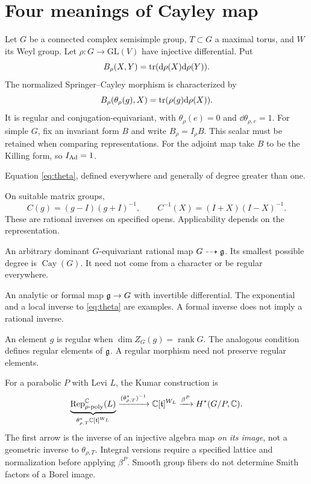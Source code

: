 \section{Four meanings of Cayley map}
Let $G$ be a connected complex semisimple group, $T\subset G$ a maximal torus, and $W$ its Weyl group. Let $\rho:G\to\mathrm{GL}(V)$ have injective differential. Put
\[
B_\rho(X,Y)=\operatorname{tr}(\mathrm d\rho(X)\mathrm d\rho(Y)).
\]
The normalized Springer--Cayley morphism is characterized by
\begin{equation}\label{eq:theta}
B_\rho(\theta_\rho(g),X)=\operatorname{tr}(\rho(g)\mathrm d\rho(X)).
\end{equation}
It is regular and conjugation-equivariant, with $\theta_\rho(e)=0$ and $\dd\theta_{\rho,e}=1$. For simple $G$, fix an invariant form $B$ and write $B_\rho=I_\rho B$. This scalar must be retained when comparing representations. For the adjoint map take $B$ to be the Killing form, so $I_{\operatorname{Ad}}=1$.
\begin{description}[style=nextline]
\item[Trace projection.] Equation \eqref{eq:theta}, defined everywhere and generally of degree greater than one.
\item[Classical matrix transform.] On suitable matrix groups,
\[
C(g)=(g-I)(g+I)^{-1},\qquad C^{-1}(X)=(I+X)(I-X)^{-1}.
\]
These are rational inverses on specified opens. Applicability depends on the representation.
\item[Equivariant rational Cayley map.] An arbitrary dominant $G$-equivariant rational map $G\dashrightarrow\mathfrak g$. Its smallest possible degree is $\operatorname{Cay}(G)$. It need not come from a character or be regular everywhere.
\item[Local coordinate map.] An analytic or formal map $\mathfrak g\to G$ with invertible differential. The exponential and a local inverse to \eqref{eq:theta} are examples. A formal inverse does not imply a rational inverse.
\end{description}
An element $g$ is regular when $\dim Z_G(g)=\operatorname{rank}G$. The analogous condition defines regular elements of $\mathfrak g$. A regular morphism need not preserve regular elements.

For a parabolic $P$ with Levi $L$, the Kumar construction is
\begin{equation}\label{eq:borel}
\underbrace{\operatorname{Rep}^{\mathbb C}_{\rho\text{-poly}}(L)}_{\theta_{\rho,T}^*\mathbb C[\mathfrak t]^{W_L}}
\xrightarrow{(\theta_{\rho,T}^*)^{-1}}\mathbb C[\mathfrak t]^{W_L}
\xrightarrow{\beta^P}H^*(G/P,\mathbb C).
\end{equation}
The first arrow is the inverse of an injective algebra map \emph{on its image}, not a geometric inverse to $\theta_{\rho,T}$. Integral versions require a specified lattice and normalization before applying $\beta^P$. Smooth group fibers do not determine Smith factors of a Borel image.

